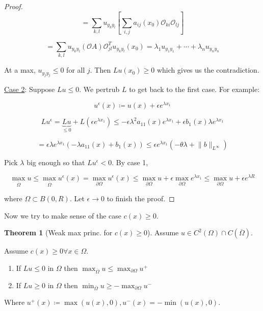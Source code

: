 \documentclass{article}
\theoremstyle{definition}
\newtheorem{theorem}{Theorem}
\begin{document}
\begin{proof}
    \[
        = \sum_{k,l} u_{y_k y_l} \left[ \sum_{i,j} a_{ij} (x_0) \mathcal{O}_{ki} \mathcal{O}_{lj} \right]
    \]

    \[
        = \sum_{k,l} u_{y_k y_l} (\mathcal{O} A) \mathcal{O}_{jl}^T u_{y_k y_l} (x_0) = \lambda_1 u_{y_1 y_1} + \cdots + \lambda_n u_{y_n y_n} 
    \]

    At a max, \(u_{y_j y_j} \leq 0\) for all \(j\). Then \(Lu(x_0) \geq 0\) which gives us the contradiction.

    \underline{Case 2}: Suppose \(Lu \leq 0\). We pertrub \(L\) to get back to the first case. For example:

    \[
        u^{\epsilon} (x) \coloneqq u(x) + \epsilon e^{\lambda x_1}
    \]

    \[
        L u^{\epsilon} = \underbrace{Lu}_{\leq 0} + L(\epsilon e^{\lambda x_1}) \leq - \epsilon \lambda^2 a_{11} (x) e^{\lambda x_1}+\epsilon b_1(x)\lambda e^{\lambda x_1}
    \]

    \[
        = \epsilon \lambda e^{\lambda x_1} (-\lambda a_{11} (x) + b_1(x)) \leq \epsilon e^{\lambda x_1}(-\theta \lambda + \lVert b \rVert _{L^{\infty}})
    \]

    Pick \(\lambda\) big enough so that \(L u^{\epsilon} < 0\). By case 1,
    
    \[
        \max_{\overline{\Omega}} u \leq  \max_{\overline{\Omega}}u^{\epsilon} (x) = \max_{\partial \Omega} u^{\epsilon} (x) \leq \max_{\partial \Omega} u + \epsilon \max_{\partial \Omega} e^{\lambda x_1} \leq \max_{\partial \Omega} u + \epsilon e^{\lambda R}
    \]

    where \(\Omega \subset B(0,R)\). Let \(\epsilon \to 0\) to finish the proof.

\end{proof}

Now we try to make sense of the case \(c(x) \geq 0\).

\begin{theorem}
    [Weak max princ. for \(c(x)\geq 0\)]

    Assume \(u\in C^2(\Omega)\cap C(\overline{\Omega})\).

    Assume \(c(x) \geq 0 \forall x\in \Omega\).

    \begin{enumerate}[label=\roman*)]
        \item If \(Lu \leq 0\) in \(\Omega\) then \(\max_{\overline{\Omega}} u \leq \max_{\partial \Omega} u^+\)
        \item If \(Lu \geq 0\) in \(\Omega\) then \(\min_{\overline{\Omega}}u \geq - \max_{\partial \Omega}u^-\)   
    \end{enumerate} 

    Where \(u^+(x) \coloneqq \max (u(x),0), u^-(x) = -\min (u(x),0)\).
\end{theorem}
\end{document}
